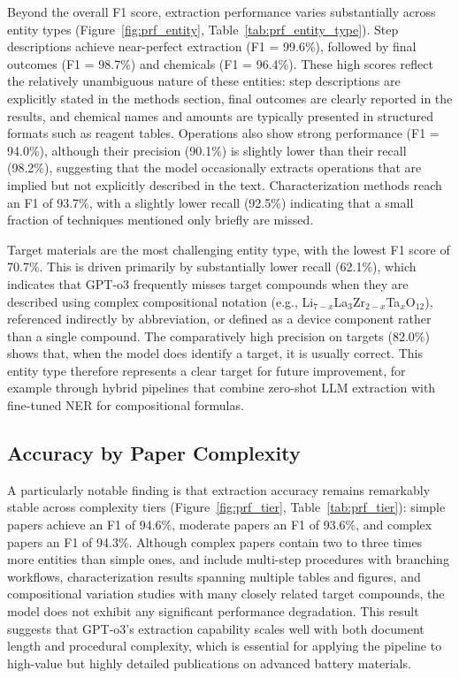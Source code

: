 \documentclass[12pt,a4paper]{article}
\begin{document}
Beyond the overall F1 score, extraction performance varies substantially across entity types (Figure~\ref{fig:prf_entity}, Table~\ref{tab:prf_entity_type}). Step descriptions achieve near-perfect extraction (F1 = 99.6\%), followed by final outcomes (F1 = 98.7\%) and chemicals (F1 = 96.4\%). These high scores reflect the relatively unambiguous nature of these entities: step descriptions are explicitly stated in the methods section, final outcomes are clearly reported in the results, and chemical names and amounts are typically presented in structured formats such as reagent tables. Operations also show strong performance (F1 = 94.0\%), although their precision (90.1\%) is slightly lower than their recall (98.2\%), suggesting that the model occasionally extracts operations that are implied but not explicitly described in the text. Characterization methods reach an F1 of 93.7\%, with a slightly lower recall (92.5\%) indicating that a small fraction of techniques mentioned only briefly are missed.

Target materials are the most challenging entity type, with the lowest F1 score of 70.7\%. This is driven primarily by substantially lower recall (62.1\%), which indicates that GPT-o3 frequently misses target compounds when they are described using complex compositional notation (e.g., Li$_{7-x}$La$_3$Zr$_{2-x}$Ta$_x$O$_{12}$), referenced indirectly by abbreviation, or defined as a device component rather than a single compound. The comparatively high precision on targets (82.0\%) shows that, when the model does identify a target, it is usually correct. This entity type therefore represents a clear target for future improvement, for example through hybrid pipelines that combine zero-shot LLM extraction with fine-tuned NER for compositional formulas.

\subsection{Accuracy by Paper Complexity}
\label{sec:by_tier}

A particularly notable finding is that extraction accuracy remains remarkably stable across complexity tiers (Figure~\ref{fig:prf_tier}, Table~\ref{tab:prf_tier}): simple papers achieve an F1 of 94.6\%, moderate papers an F1 of 93.6\%, and complex papers an F1 of 94.3\%. Although complex papers contain two to three times more entities than simple ones, and include multi-step procedures with branching workflows, characterization results spanning multiple tables and figures, and compositional variation studies with many closely related target compounds, the model does not exhibit any significant performance degradation. This result suggests that GPT-o3's extraction capability scales well with both document length and procedural complexity, which is essential for applying the pipeline to high-value but highly detailed publications on advanced battery materials.
\end{document}

